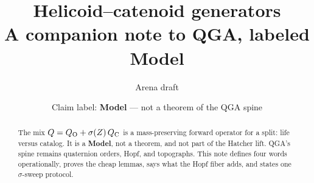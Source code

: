 \documentclass[11pt]{article}
\title{Helicoid--catenoid generators\\[2pt]
\large A companion note to QGA, labeled Model}
\author{Arena draft}
\date{Claim label: \textbf{Model} --- not a theorem of the QGA spine}
\begin{document}
\maketitle
\vspace{-1.0em}

\begin{abstract}
\noindent
The mix \(Q=Q_{\mathrm{O}}+\sigma(Z)\,Q_{\mathrm{C}}\) is a mass-preserving forward operator
for a split: life versus catalog.
It is a \textbf{Model}, not a theorem, and not part of the Hatcher lift.
QGA's spine remains quaternion orders, Hopf, and topographs.
This note defines four words operationally,
proves the cheap lemmas,
says what the Hopf fiber adds,
and states one \(\sigma\)-sweep protocol.
\end{abstract}








\end{document}
